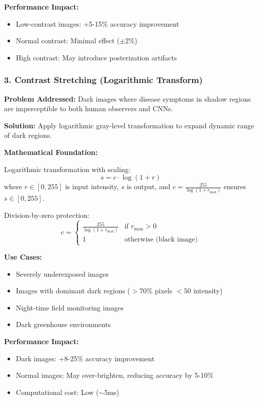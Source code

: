 \documentclass[12pt,a4paper]{article}
\begin{document}
\textbf{Performance Impact:}
\begin{itemize}
    \item Low-contrast images: +5-15\% accuracy improvement
    \item Normal contrast: Minimal effect ($\pm$2\%)
    \item High contrast: May introduce posterization artifacts
\end{itemize}

\subsubsection*{3. Contrast Stretching (Logarithmic Transform)}

\textbf{Problem Addressed:} Dark images where disease symptoms in shadow regions are imperceptible to both human observers and CNNs.

\textbf{Solution:} Apply logarithmic gray-level transformation to expand dynamic range of dark regions.

\textbf{Mathematical Foundation:}

Logarithmic transformation with scaling:
\begin{equation*}
    s = c \cdot \log(1 + r)
\end{equation*}
where $r \in [0, 255]$ is input intensity, $s$ is output, and $c = \frac{255}{\log(1 + r_{\max})}$ ensures $s \in [0, 255]$.

Division-by-zero protection:
\begin{equation*}
    c = \begin{cases}
        \frac{255}{\log(1 + r_{\max})} & \text{if } r_{\max} > 0 \\
        1 & \text{otherwise (black image)}
    \end{cases}
\end{equation*}

\textbf{Use Cases:}
\begin{itemize}
    \item Severely underexposed images
    \item Images with dominant dark regions ($>70\%$ pixels $< 50$ intensity)
    \item Night-time field monitoring images
    \item Dark greenhouse environments
\end{itemize}

\textbf{Performance Impact:}
\begin{itemize}
    \item Dark images: +8-25\% accuracy improvement
    \item Normal images: May over-brighten, reducing accuracy by 5-10\%
    \item Computational cost: Low ($\sim$5ms)
\end{itemize}
\end{document}
